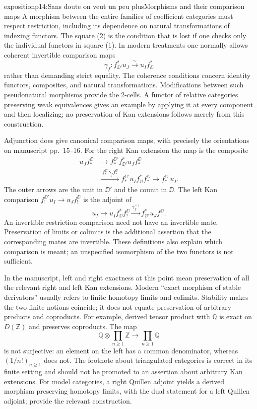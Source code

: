 \begin{dcomment}{exposition}{p14:Sans doute on veut un peu plus}{Morphisms and their comparison maps}
A morphism between the entire families of coefficient categories must respect restriction, including its dependence on natural transformations of indexing functors. The square (2) is the condition that is lost if one checks only the individual functors in square (1). In modern treatments one normally allows coherent invertible comparison maps
\[
 \gamma_f:f^*_{\DD'}u_J\xrightarrow{\sim}u_If^*_{\DD}
\]
rather than demanding strict equality. The coherence conditions concern identity functors, composites, and natural transformations. Modifications between such pseudonatural morphisms provide the 2-cells. A functor of relative categories preserving weak equivalences gives an example by applying it at every component and then localizing; no preservation of Kan extensions follows merely from this construction.

Adjunction does give canonical comparison maps, with precisely the orientations on manuscript pp.~15--16. For the right Kan extension the map is the composite
\[
\begin{aligned}
 u_Jf_*^{\DD}
 &\longrightarrow f_*^{\DD'}f^{*}_{\DD'}u_Jf_*^{\DD}\\
 &\xrightarrow{\ f_*^{\DD'}\gamma_f f_*^{\DD}\ }
 f_*^{\DD'}u_If^{*}_{\DD}f_*^{\DD}
 \longrightarrow f_*^{\DD'}u_I.
\end{aligned}
\]
The outer arrows are the unit in $\DD'$ and the counit in $\DD$. The left Kan comparison $f_!^{\DD'}u_I\to u_Jf_!^{\DD}$ is the adjoint of
\[
 u_I\longrightarrow u_If^*_{\DD}f_!^{\DD}
 \xrightarrow{\gamma_f^{-1}}f^*_{\DD'}u_Jf_!^{\DD}.
\]
An invertible restriction comparison need not have an invertible mate. Preservation of limits or colimits is the additional assertion that the corresponding mates are invertible. These definitions also explain which comparison is meant; an unspecified isomorphism of the two functors is not sufficient.

In the manuscript, left and right exactness at this point mean preservation of all the relevant right and left Kan extensions. Modern ``exact morphism of stable derivators'' usually refers to finite homotopy limits and colimits. Stability makes the two finite notions coincide; it does not equate preservation of arbitrary products and coproducts. For example, derived tensor product with $\mathbb Q$ is exact on $D(\mathbb Z)$ and preserves coproducts. The map
\[
 \mathbb Q\otimes\prod_{n\geq1}\mathbb Z
 \longrightarrow\prod_{n\geq1}\mathbb Q
\]
is not surjective: an element on the left has a common denominator, whereas $(1/n!)_{n\geq1}$ does not. The footnote about triangulated categories is correct in its finite setting and should not be promoted to an assertion about arbitrary Kan extensions. For model categories, a right Quillen adjoint yields a derived morphism preserving homotopy limits, with the dual statement for a left Quillen adjoint; \citet[Proposition~6.12 and its dual]{Cisinski2003} provide the relevant construction.
\end{dcomment}


